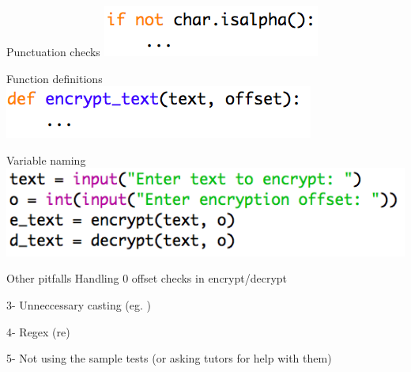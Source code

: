 \documentclass[week2]{csse1001}
\begin{document}
\begin{topic}{Punctuation checks}
\includegraphics[width=\textwidth]{a1pitfalls/punctugood}
\end{topic}

\begin{topic}{Function definitions}
\includegraphics[width=\textwidth]{a1pitfalls/fdef}
\end{topic}

\begin{topic}{Variable naming}
\includegraphics[width=\textwidth]{a1pitfalls/vname}
\end{topic}

\begin{topic}{Other pitfalls}
Handling 0 offset checks in encrypt/decrypt

\begin{subtopic}{2-}
Duplicated code in main (could've split into other functions}
\end{subtopic}

\begin{subtopic}{3-}
Unneccessary casting (eg. )
\end{subtopic}

\begin{subtopic}{4-}
Regex (re)
\end{subtopic}

\begin{subtopic}{5-}
Not using the sample tests (or asking tutors for help with them)
\end{subtopic}
\end{topic}
\end{document}
